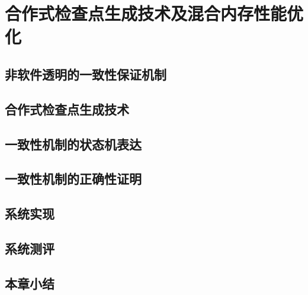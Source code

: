 \chapter{合作式检查点生成技术及混合内存性能优化}
\label{chap:thnvm}

\section{非软件透明的一致性保证机制}

\section{合作式检查点生成技术}

\section{一致性机制的状态机表达}

\section{一致性机制的正确性证明}

\section{系统实现}

\section{系统测评}

\section{本章小结}


